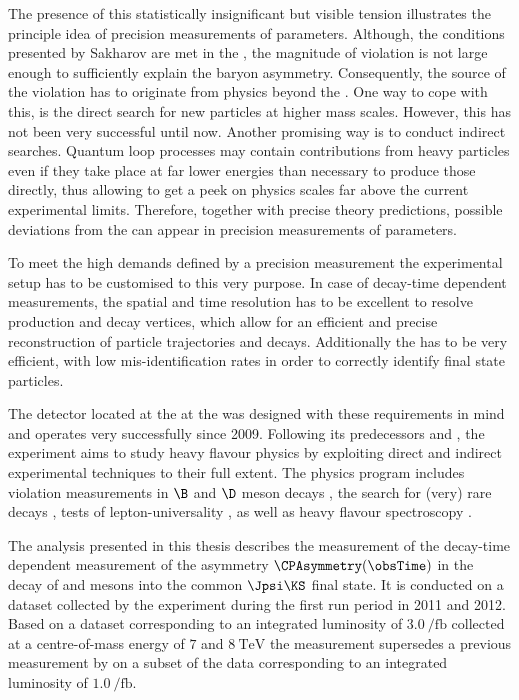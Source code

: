 The presence of this statistically insignificant but visible tension illustrates
the principle idea of precision measurements of \CKM parameters. Although, the
conditions presented by Sakharov are met in the \SM, the magnitude of \CP
violation is not large enough to sufficiently explain the baryon asymmetry.
Consequently, the source of the \CP violation has to originate from physics
beyond the \SM. One way to cope with this, is the direct search for new
particles at higher mass scales. However, this has not been very successful
until now. Another promising way is to conduct indirect searches. Quantum loop
processes may contain contributions from heavy particles even if they take place
at far lower energies than necessary to produce those directly, thus allowing to
get a peek on physics scales far above the current experimental limits.
Therefore, together with precise theory predictions, possible deviations from
the \SM can appear in precision measurements of \SM parameters.

To meet the high demands defined by a precision measurement the experimental
setup has to be customised to this very purpose. In case of decay-time dependent
measurements, the spatial and time resolution has to be excellent to resolve
production and decay vertices, which allow for an efficient and precise
reconstruction of particle trajectories and decays. Additionally the \PID has to
be very efficient, with low mis-identification rates in order to correctly
identify final state particles.


The \LHCb detector located at the \LHC at the \CERN was designed with these
requirements in mind and operates very successfully since 2009. Following its
predecessors \Babar and \Belle, the \LHCb experiment aims to study heavy flavour
physics by exploiting direct and indirect experimental techniques to their full
extent. The physics program includes \CP violation measurements in $\B$ and $\D$
meson decays
\cite{Aaij:2015tza,Aaij:2015yda,Aaij:2014uva,Aaij:2014fba,Aaij:2014dka,Aaij:2014zsa,Aaij:2014kxa}, 
the search for (very) rare decays \cite{CMS:2014xfa}, tests of
lepton-universality \cite{Aaij:2014ora,Aaij:2015yra}, as well as heavy flavour
spectroscopy \cite{Aaij:2014yka,Aaij:2015tga}.

The analysis presented in this thesis describes the measurement of the
decay-time dependent measurement of the \CP asymmetry $\CPAsymmetry(\obsTime)$
in the decay of \Bd and \Bdbar mesons into the common $\Jpsi\KS$ final state. It
is conducted on a dataset collected by the \LHCb experiment during the first
\LHC run period in 2011 and 2012. Based on a dataset corresponding to an
integrated luminosity of $\SI{3.0}{\per\femto\barn}$ collected at a
centre-of-mass energy of $\num{7}$ and $\SI{8}{\TeV}$ the measurement supersedes
a previous measurement by \LHCb \cite{Aaij:1497268} on a subset of the data
corresponding to an integrated luminosity of $\SI{1.0}{\per\femto\barn}$.

